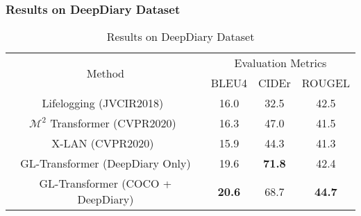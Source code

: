 \documentclass[journal]{IEEEtran}
\begin{document}
\subsubsection{Results on DeepDiary Dataset}




\begin{table}[]
\centering
\caption{Results on DeepDiary Dataset}
\label{tab:res_deepdiary_dataset}
\begin{tabular}{@{}cccc@{}}
\toprule
\multirow{2}{*}{Method}           & \multicolumn{3}{c}{Evaluation Metrics}        \\ \cmidrule(l){2-4} 
                                  & BLEU4         & CIDEr         & ROUGEL        \\ \midrule
Lifelogging (JVCIR2018)~\cite{fan2018deepdiary}                       & 16.0          & 32.5          & 42.5          \\ 
$\mathcal{M}^2$ Transformer (CVPR2020)~\cite{cornia2020meshed} & 16.3 & 47.0 & 41.5 \\ 
X-LAN (CVPR2020)~\cite{xlinear2020cvpr} & 15.9 & 44.3 & 41.3     \\ \midrule
GL-Transformer (DeepDiary Only)   & 19.6          & \textbf{71.8} & 42.4          \\
GL-Transformer (COCO + DeepDiary) & \textbf{20.6} & 68.7          & \textbf{44.7} \\ \bottomrule
\end{tabular}%

\end{table}
\end{document}
